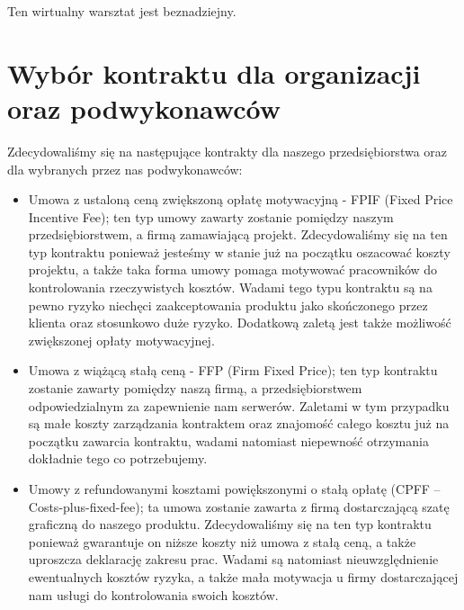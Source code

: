 Ten wirtualny warsztat jest beznadziejny.


\section{Wybór kontraktu dla organizacji oraz podwykonawców}

Zdecydowaliśmy się na następujące kontrakty dla naszego przedsiębiorstwa oraz dla wybranych przez nas podwykonawców:
\begin{itemize}
\item Umowa z ustaloną ceną zwiększoną opłatę motywacyjną - FPIF (Fixed Price Incentive Fee); ten typ umowy zawarty zostanie pomiędzy naszym przedsiębiorstwem, a firmą zamawiającą projekt. Zdecydowaliśmy się na ten typ kontraktu ponieważ jesteśmy w stanie już na początku oszacować koszty projektu, a także taka forma umowy pomaga motywować pracowników do kontrolowania rzeczywistych kosztów. Wadami tego typu kontraktu są na pewno ryzyko niechęci zaakceptowania produktu jako skończonego przez klienta oraz stosunkowo duże ryzyko. Dodatkową zaletą jest także możliwość zwiększonej opłaty motywacyjnej.
\item Umowa z wiążącą stałą ceną - FFP (Firm Fixed Price); ten typ kontraktu zostanie zawarty pomiędzy naszą firmą, a przedsiębiorstwem odpowiedzialnym za zapewnienie nam serwerów. Zaletami w tym przypadku są małe koszty zarządzania kontraktem oraz znajomość całego kosztu już na początku zawarcia kontraktu, wadami natomiast niepewność otrzymania dokładnie tego co potrzebujemy.
\item Umowy z refundowanymi kosztami powiększonymi o stałą opłatę (CPFF – Costs-plus-fixed-fee);  ta umowa zostanie zawarta z firmą dostarczającą szatę graficzną do naszego produktu. Zdecydowaliśmy się na ten typ kontraktu ponieważ gwarantuje on niższe koszty niż umowa z stałą ceną, a także uproszcza deklarację zakresu prac. Wadami są natomiast nieuwzględnienie ewentualnych kosztów ryzyka, a także mała motywacja u firmy dostarczającej nam usługi do kontrolowania swoich kosztów.
\end{itemize}

